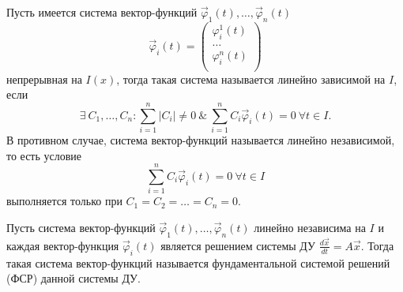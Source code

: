 \begin{definition}
    Пусть имеется система вектор-функций $\overrightarrow \varphi_1(t), \dots, \overrightarrow \varphi_n(t)$
    \begin{equation}
        \overrightarrow \varphi_i(t) =
        \begin{pmatrix}
            \varphi_i^1(t) \\
            \dots \\
            \varphi_i^n(t) \\
        \end{pmatrix}           
    \end{equation}
    непрерывная на $I(x)$, тогда такая система называется
    линейно зависимой на $I$, если \[\exists ~ C_1, \dots, C_n : \sum^n_{i = 1} |C_i| \neq 0 ~ \& ~ \sum^n_{i = 1} C_i \overrightarrow \varphi_i(t) = 0 ~ \forall t \in I.\]
    В противном случае, система вектор-функций называется линейно независимой, то есть условие
    \[\sum^n_{i = 1} C_i \overrightarrow \varphi_i(t) = 0 ~ \forall t \in I\] выполняется только при $C_1 = C_2 = \dots = C_n = 0$.
\end{definition}

\begin{definition}
    Пусть система вектор-функций $\overrightarrow \varphi_1(t), \dots, \overrightarrow \varphi_n(t)$ линейно независима на $I$ и каждая вектор-функция
    $\overrightarrow \varphi_i(t)$ является решением системы ДУ $\frac{d \overrightarrow x}{dt} = A \overrightarrow x$. Тогда такая система вектор-функций
    называется фундаментальной системой решений (ФСР) данной системы ДУ.
\end{definition}

